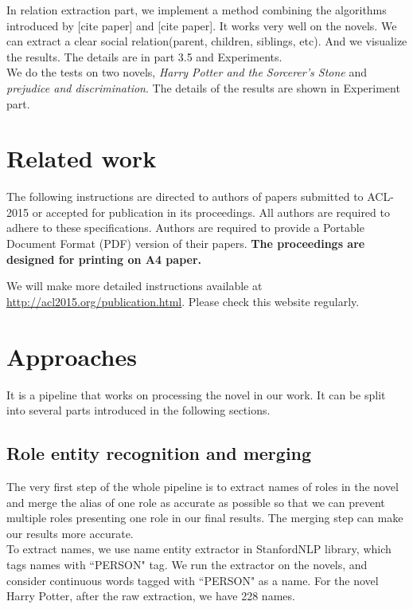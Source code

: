 \documentclass[11pt]{article}
\begin{document}
In relation extraction part, we implement a method combining the algorithms introduced by 
[cite paper] and [cite paper]. It works very well on the novels. We can extract a clear social relation(parent, children, siblings, etc). And we visualize the results. The details are in part 3.5 and Experiments. \\

We do the tests on two novels, \textit{Harry Potter and the Sorcerer's Stone} and \textit{prejudice and discrimination}. The details of the results are shown in Experiment part.

\section{Related work} %

The following instructions are directed to authors of papers submitted
to ACL-2015 or accepted for publication in its proceedings. All
authors are required to adhere to these specifications. Authors are
required to provide a Portable Document Format (PDF) version of their
papers. \textbf{The proceedings are designed for printing on A4
paper.}

We will make more detailed instructions available at
\url{http://acl2015.org/publication.html}. Please check this website 
regularly.


\section{Approaches}

It is a pipeline that works on processing the novel in our work. It can be split into several parts introduced in the following sections.

\subsection{Role entity recognition and merging} %

The very first step of the whole pipeline is to extract names of roles in the novel and merge the alias of one role as accurate as possible so that we can prevent multiple roles presenting one role in our final results. The merging step can make our results more accurate. \\

To extract names, we use name entity extractor in StanfordNLP library, which tags names with ``PERSON" tag. We run the extractor on the novels, and consider continuous words tagged with ``PERSON" as a name. For the novel Harry Potter, after the raw extraction, we have 228 names. \\
\end{document}
